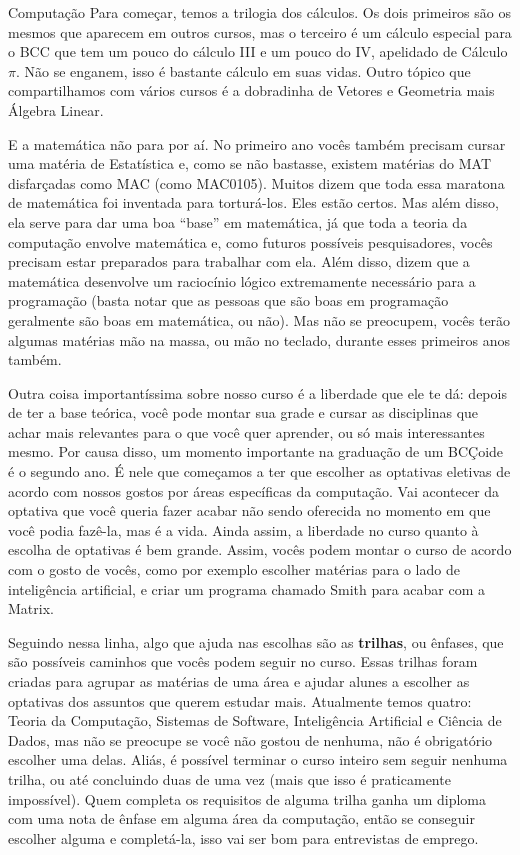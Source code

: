 \begin{subsecao}{Computação}
Para começar, temos a trilogia dos cálculos. Os dois primeiros são os mesmos
que aparecem em outros cursos, mas o terceiro é um cálculo especial para o BCC
que tem um pouco do cálculo III e um pouco do IV, apelidado de Cálculo $\pi$.
Não se enganem, isso é bastante cálculo em suas vidas. Outro tópico que
compartilhamos com vários cursos é a dobradinha de Vetores e Geometria mais
Álgebra Linear. 

E a matemática não para por aí. No primeiro ano vocês também precisam cursar
uma matéria de Estatística e, como se não bastasse, existem matérias do MAT
disfarçadas como MAC (como MAC0105). Muitos dizem que toda essa maratona de
matemática foi inventada para torturá-los. Eles estão certos. Mas além disso,
ela serve para dar uma boa ``base'' em matemática, já que toda a teoria da
computação envolve matemática e, como futuros possíveis pesquisadores, vocês
precisam estar preparados para trabalhar com ela. Além disso, dizem que a
matemática desenvolve um raciocínio lógico extremamente necessário para a
programação (basta notar que as pessoas que são boas em programação geralmente
são boas em matemática, ou não). Mas não se preocupem, vocês terão algumas
matérias mão na massa, ou mão no teclado, durante esses primeiros anos também.

Outra coisa importantíssima sobre nosso curso é a liberdade que ele te dá:
depois de ter a base teórica, você pode montar sua grade e cursar as
disciplinas que achar mais relevantes para o que você quer aprender, ou só
mais interessantes mesmo. Por causa disso, um momento importante na graduação
de um BCÇoide é o segundo ano. É nele que começamos a ter que escolher as
optativas eletivas de acordo com nossos gostos por áreas específicas da
computação. Vai acontecer da optativa que você queria fazer acabar não sendo
oferecida no momento em que você podia fazê-la, mas é a vida. Ainda assim, a
liberdade no curso quanto à escolha de optativas é bem grande. Assim, vocês
podem montar o curso de acordo com o gosto de vocês, como por exemplo escolher
matérias para o lado de inteligência artificial, e criar um programa chamado
Smith para acabar com a Matrix.

Seguindo nessa linha, algo que ajuda nas escolhas são as \textbf{trilhas}, ou
ênfases, que são possíveis caminhos que vocês podem seguir no curso. Essas
trilhas foram criadas para agrupar as matérias de uma área e ajudar alunes a
escolher as optativas dos assuntos que querem estudar mais. Atualmente temos
quatro: Teoria da Computação, Sistemas de Software, Inteligência Artificial e
Ciência de Dados, mas não se preocupe se você não gostou de nenhuma, não é
obrigatório escolher uma delas. Aliás, é possível terminar o curso inteiro sem
seguir nenhuma trilha, ou até concluindo duas de uma vez (mais que isso é
praticamente impossível). Quem completa os requisitos de alguma trilha ganha
um diploma com uma nota de ênfase em alguma área da computação, então se
conseguir escolher alguma e completá-la, isso vai ser bom para entrevistas de
emprego.


\end{subsecao}
